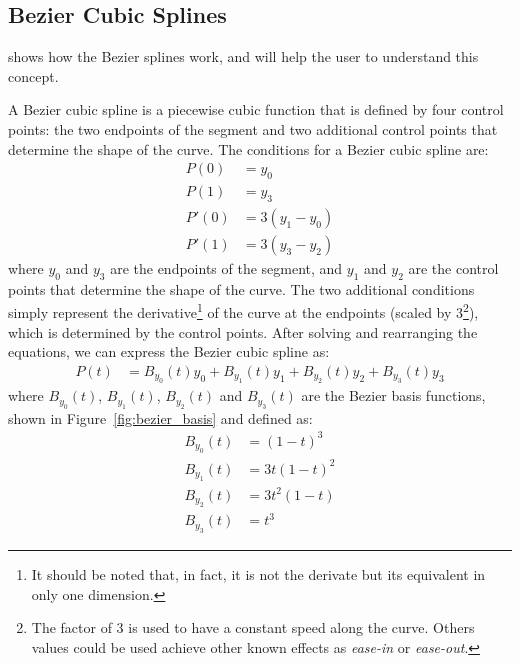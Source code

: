 \subsection{Bezier Cubic Splines}
\begin{observacion}
     shows how the Bezier splines work, and will help the user to understand this concept.
\end{observacion}
A Bezier cubic spline is a piecewise cubic function that is defined by four control points: the two endpoints of the segment and two additional control points that determine the shape of the curve. The conditions for a Bezier cubic spline are:
\begin{align*}
    P(0) &= y_0 \\
    P(1) &= y_3 \\
    P'(0) &= 3(y_1 - y_0) \\
    P'(1) &= 3(y_3 - y_2)
\end{align*}
where $y_0$ and $y_3$ are the endpoints of the segment, and $y_1$ and $y_2$ are the control points that determine the shape of the curve. The two additional conditions simply represent the derivative\footnote{It should be noted that, in fact, it is not the derivate but its equivalent in only one dimension.} of the curve at the endpoints (scaled by 3\footnote{The factor of $3$ is used to have a constant speed along the curve. Others values could be used achieve other known effects as \emph{ease-in} or \emph{ease-out}.}), which is determined by the control points. After solving and rearranging the equations, we can express the Bezier cubic spline as:
\begin{align*}
    P(t) &= B_{y_0}(t) y_0 + B_{y_1}(t) y_1 + B_{y_2}(t) y_2 + B_{y_3}(t) y_3
\end{align*}
where $B_{y_0}(t)$, $B_{y_1}(t)$, $B_{y_2}(t)$ and $B_{y_3}(t)$ are the Bezier basis functions, shown in Figure~\ref{fig:bezier_basis} and defined as:
\begin{align*}
    B_{y_0}(t) &= (1 - t)^3 \\
    B_{y_1}(t) &= 3t(1 - t)^2 \\
    B_{y_2}(t) &= 3t^2(1 - t) \\
    B_{y_3}(t) &= t^3
\end{align*}

